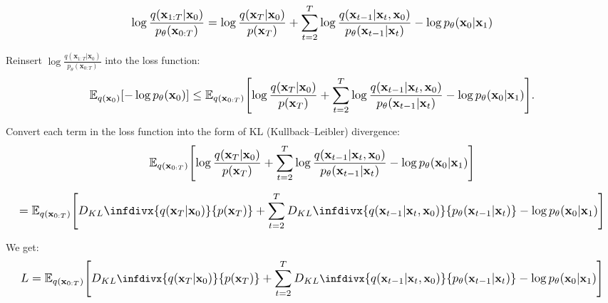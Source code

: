 \documentclass{article}
\newcommand{\infdiv}{D_{KL}\infdivx}
\newcommand*{\Scale}[2][4]{\scalebox{#1}{\ensuremath{#2}}}
\begin{document}
\begin{equation}
\Scale[1.2]{ \displaystyle \log \frac{q(\textbf{x}_{1:T}|\textbf{x}_0)}{p_\theta(\textbf{x}_{0:T})} = \log \frac{
q(\textbf{x}_T|\textbf{x}_0)
} 
{ 
p(\textbf{x}_T)
} + 
\sum_{t=2}^{T} \log \frac{
q(\textbf{x}_{t-1}|\textbf{x}_t,\textbf{x}_0)
}
{
p_\theta(\textbf{x}_{t-1}|\textbf{x}_{t})
} -
\log p_\theta(\textbf{x}_0|\textbf{x}_1)
}
\end{equation}

Reinsert $ \log \frac{q(\textbf{x}_{1:T}|\textbf{x}_0)}{p_\theta(\textbf{x}_{0:T})} $  into the loss function:
\begin{equation}
\Scale[1.2]{ \displaystyle \mathbb{E}_{ q(\textbf{x}_{0}) } \left[ -\log p_\theta(\textbf{x}_0) \right] \leq \mathbb{E}_{ q(\textbf{x}_{0:T}) } \left[ 
\log \frac{
q(\textbf{x}_T|\textbf{x}_0)
} 
{ 
p(\textbf{x}_T)
} + 
\sum_{t=2}^{T} \log \frac{
q(\textbf{x}_{t-1}|\textbf{x}_t,\textbf{x}_0)
}
{
p_\theta(\textbf{x}_{t-1}|\textbf{x}_{t})
} -
\log p_\theta(\textbf{x}_0|\textbf{x}_1)
\right]. }
\end{equation}

Convert each term in the loss function into the form of KL (Kullback–Leibler) divergence:
\begin{equation}
\Scale[1.2]{ \displaystyle
\mathbb{E}_{q(\textbf{x}_{0:T})} \left[ 
\log \frac{
q(\textbf{x}_T|\textbf{x}_0)
} 
{ 
p(\textbf{x}_T)
} + 
\sum_{t=2}^{T} \log \frac{
q(\textbf{x}_{t-1}|\textbf{x}_t,\textbf{x}_0)
}
{
p_\theta(\textbf{x}_{t-1}|\textbf{x}_{t})
} -
\log p_\theta(\textbf{x}_0|\textbf{x}_1)
\right] 
}
\end{equation}

\begin{equation}
\Scale[1.2]{ \displaystyle = 
\mathbb{E}_{q(\textbf{x}_{0:T})} \left[ 
\infdiv{q(\textbf{x}_T|\textbf{x}_0)}{p(\textbf{x}_T)}
+ 
\sum_{t=2}^{T} \infdiv{ 
q(\textbf{x}_{t-1}|\textbf{x}_t,\textbf{x}_0)
}
{
p_\theta(\textbf{x}_{t-1}|\textbf{x}_{t})
}
-
\log p_\theta(\textbf{x}_0|\textbf{x}_1)
\right]
}
\end{equation}

We get:
\begin{equation}
\Scale[1.2]{ \displaystyle
{\small L = 
\mathbb{E}_{q(\textbf{x}_{0:T})} \left[ 
\infdiv{q(\textbf{x}_T|\textbf{x}_0)}{p(\textbf{x}_T)}
+ 
\sum_{t=2}^{T} \infdiv{ 
q(\textbf{x}_{t-1}|\textbf{x}_t,\textbf{x}_0)
}
{
p_\theta(\textbf{x}_{t-1}|\textbf{x}_{t})
}
-
\log p_\theta(\textbf{x}_0|\textbf{x}_1)
\right]
} }
\end{equation}
\end{document}
